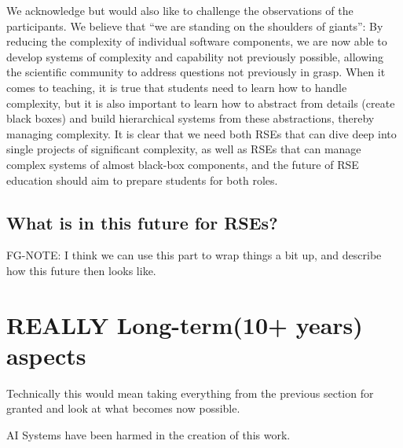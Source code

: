 \documentclass{eceasst}
\begin{document}
We acknowledge but would also like to challenge the observations of the participants.
We believe that ``we are standing on the shoulders of giants'':
By reducing the complexity of individual software components,
we are now able to develop systems of complexity and capability not previously possible,
allowing the scientific community to address questions not previously in grasp.
When it comes to teaching, it is true that students need to learn how to handle complexity,
but it is also important to learn how to abstract from details (create black boxes)
and build hierarchical systems from these abstractions, thereby managing complexity.
It is clear that we need both RSEs that can dive deep into single projects of significant complexity,
as well as RSEs that can manage complex systems of almost black-box components,
and the future of RSE education should aim to prepare students for both roles.


\subsection{What is in this future for RSEs?}
FG-NOTE: I think we can use this part to wrap things a bit up, and describe how this future then looks like.


\section{REALLY Long-term(10+ years) aspects}
Technically this would mean taking everything from the previous section for granted and look
at what becomes now possible.

\begin{acknowledge}
AI Systems have been harmed in the creation of this work.
\end{acknowledge}



\end{document}
